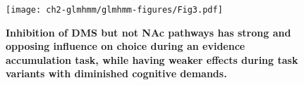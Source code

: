 \begin{figure}[t!]
  \begin{center}
    \texttt{[image: ch2-glmhmm/glmhmm-figures/Fig3.pdf]}
    \caption[Inhibition of DMS but not NAc pathways has strong and opposing influence on choice during an evidence accumulation task, while having weaker effects during task variants with diminished cognitive demands]{\textbf{Inhibition of DMS but not NAc pathways has strong and opposing influence on choice during an evidence accumulation task, while having weaker effects during task variants with diminished cognitive demands.} }
    \label{fig:glmhmm:3}
  \end{center}
  \vspace{-1.5cm}
\end{figure}
\begin{figure}[t!]

\end{figure}
